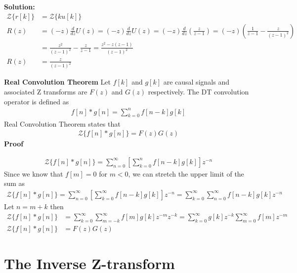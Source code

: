 \documentclass[twoside]{article}
\begin{document}
\textbf{Solution:}
%
\begin{align*}
\mathcal{Z} \lbrace r[k] \rbrace &= \mathcal{Z} \lbrace k u[k] \rbrace  
\\
R(z) &= (- z) \frac{d}{dz} U(z) = (- z) \frac{d}{dz} U(z) =  (- z)
       \frac{d}{dz} \left( \frac{z}{z-1} \right)
       =  (- z) \left( \frac{1}{z-1} - \frac{z}{(z-1)^2} \right)
\\
&= \frac{z^2}{(z-1)^2} - \frac{z}{z-1} = \frac{z^2 - z(z-1)}{(z-1)^2}
\\
R(z) &= \frac{z}{(z-1)^2}
\end{align*}


\textbf{Real Convolution Theorem}
%
Let $f[k]$ and $g[k]$ are causal signals and associated Z transforms
are $F(z)$ and $G(z)$ respectively.
%
The DT convolution operator is defined as
%
\begin{align*}
 f[n] \ast g[n] = \sum\limits_{k=0}^{n} f[n-k] g[k]
\end{align*}
%
Real Convolution Theorem states that
%
\begin{align*}
 \mathcal{Z} \lbrace f[n] \ast g[n] \rbrace = F(z) G(z)
\end{align*}
%
\textbf{Proof}

\begin{align*}
 \mathcal{Z} \lbrace f[n] \ast g[n] \rbrace =
  \sum\limits_{n=0}^{\infty} \left [ \sum\limits_{k=0}^{n} f[n-k] g[k]
  \right] z^{-n}
\end{align*}
%
Since we know that $f[m] = 0$ for $m<0$, we can stretch the upper
limit of the sum as
%
\begin{align*}
 \mathcal{Z} \lbrace f[n] \ast g[n] \rbrace =
  \sum\limits_{n=0}^{\infty} \left [ \sum\limits_{k=0}^{\infty} f[n-k] g[k]
  \right] z^{-n}
 = \sum\limits_{k=0}^{\infty} \sum\limits_{n=0}^{\infty}  f[n-k] g[k] z^{-n}
\end{align*}
%
Let $n = m + k$ then 
%
\begin{align*}
 \mathcal{Z} \lbrace f[n] \ast g[n] \rbrace &=
  \sum\limits_{k=0}^{\infty}  \sum\limits_{m=-k}^{\infty} f[m] g[k]
  z^{-m} z^{-k}
  = \sum\limits_{k=0}^{\infty} g[k] z^{-k} \sum\limits_{m=0}^{\infty}
  f[m] z^{-m} 
\\
 \mathcal{Z} \lbrace f[n] \ast g[n] \rbrace &= F(z) G(z) 
\end{align*}
%

\section{The Inverse Z-transform}
\end{document}
